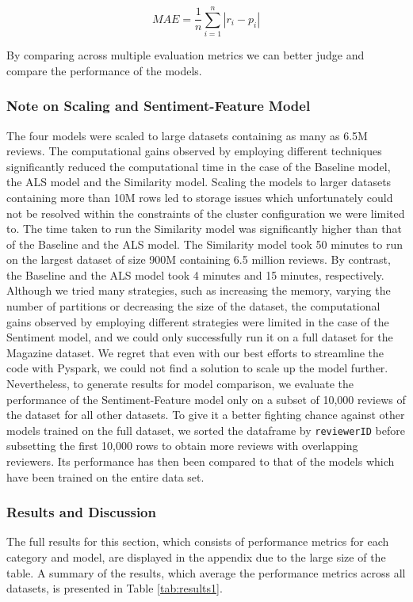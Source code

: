 \documentclass[sigconf,authorversion,nonacm]{acmart}
\begin{document}
$$ MAE = \frac{1}{n} \sum^{n}_{i=1} | r_i - p_i | $$

By comparing across multiple evaluation metrics we can better judge and compare the performance of the models. 

\subsubsection{Note on Scaling and Sentiment-Feature Model}
The four models were scaled to large datasets containing as many as 6.5M reviews. The computational gains observed by employing different techniques significantly reduced the computational time in the case of the Baseline model, the ALS model and the Similarity model. Scaling the models to larger datasets containing more than 10M rows led to storage issues which unfortunately could not be resolved within the constraints of the cluster configuration we were limited to. The time taken to run the Similarity model was significantly higher than that of the Baseline and the ALS model. The Similarity model took 50 minutes to run on the largest dataset of size 900M containing 6.5 million reviews. By contrast, the Baseline and the ALS model took 4 minutes and 15 minutes, respectively. Although we tried many strategies, such as increasing the memory, varying the number of partitions or decreasing the size of the dataset, the computational gains observed by employing different strategies were limited in the case of the Sentiment model, and we could only successfully run it on a full dataset for the Magazine dataset. We regret that even with our best efforts to streamline the code with Pyspark, we could not find a solution to scale up the model further. Nevertheless, to generate results for model comparison, we evaluate the performance of the Sentiment-Feature model only on a subset of 10,000 reviews of the dataset for all other datasets. To give it a better fighting chance against other models trained on the full dataset, we sorted the dataframe by \verb|reviewerID| before subsetting the first 10,000 rows to obtain more reviews with overlapping reviewers. Its performance has then been compared to that of the models which have been trained on the entire data set.

\subsubsection{Results and Discussion}
The full results for this section, which consists of performance metrics for each category and model, are displayed in the appendix due to the large size of the table. A summary of the results, which average the performance metrics across all datasets, is presented in Table \ref{tab:results1}. 
\end{document}
